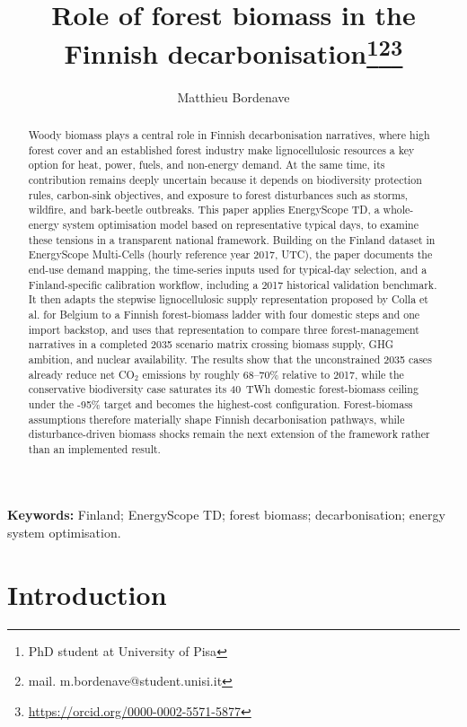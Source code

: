 \documentclass{article}
\title{Role of forest biomass in the Finnish decarbonisation\footnote{PhD student at University of Pisa}\footnote{mail. m.bordenave@student.unisi.it}\footnote{\url{https://orcid.org/0000-0002-5571-5877}}}
\author{Matthieu Bordenave}
\date{}
\begin{document}
\maketitle{}

\begin{abstract}
Woody biomass plays a central role in Finnish decarbonisation narratives, where high forest cover and an established forest industry make lignocellulosic resources a key option for heat, power, fuels, and non-energy demand. At the same time, its contribution remains deeply uncertain because it depends on biodiversity protection rules, carbon-sink objectives, and exposure to forest disturbances such as storms, wildfire, and bark-beetle outbreaks. This paper applies EnergyScope TD, a whole-energy system optimisation model based on representative typical days, to examine these tensions in a transparent national framework. Building on the Finland dataset in EnergyScope Multi-Cells (hourly reference year 2017, UTC), the paper documents the end-use demand mapping, the time-series inputs used for typical-day selection, and a Finland-specific calibration workflow, including a 2017 historical validation benchmark. It then adapts the stepwise lignocellulosic supply representation proposed by Colla et al. for Belgium to a Finnish forest-biomass ladder with four domestic steps and one import backstop, and uses that representation to compare three forest-management narratives in a completed 2035 scenario matrix crossing biomass supply, GHG ambition, and nuclear availability. The results show that the unconstrained 2035 cases already reduce net CO$_2$ emissions by roughly 68--70\% relative to 2017, while the conservative biodiversity case saturates its 40~TWh domestic forest-biomass ceiling under the -95\% target and becomes the highest-cost configuration. Forest-biomass assumptions therefore materially shape Finnish decarbonisation pathways, while disturbance-driven biomass shocks remain the next extension of the framework rather than an implemented result.
\end{abstract}

\noindent\textbf{Keywords:} Finland; EnergyScope TD; forest biomass; decarbonisation; energy system optimisation.

\newpage

\section{Introduction}
\end{document}
